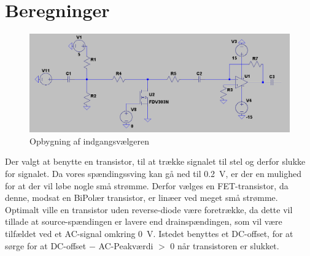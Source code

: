 \section{Beregninger}

\begin{figure}[h]
\centering
\includegraphics[scale=0.4]{teknisk/indgangsvaelger/signal-taend-sluk.png}
\caption{Opbygning af indgangsvælgeren}
\label{indgangsvaelger-overordnet}
\end{figure}
Der valgt at benytte en transistor, til at trække signalet til stel og derfor slukke for signalet. Da vores spændingssving kan gå ned til 0.2~V, er der en mulighed  for at der vil løbe nogle små strømme. Derfor vælges en FET-transistor, da denne, modsat en BiPolær transistor, er linæer ved meget små strømme. Optimalt ville en transistor uden reverse-diode være foretrække, da dette vil tillade at source-spændingen er lavere end drainspændingen, som vil være tilfældet ved et AC-signal omkring 0~V. Istedet benyttes et DC-offset, for at sørge for at DC-offset $-$ AC-Peakværdi $>$ 0 når transistoren er slukket.

